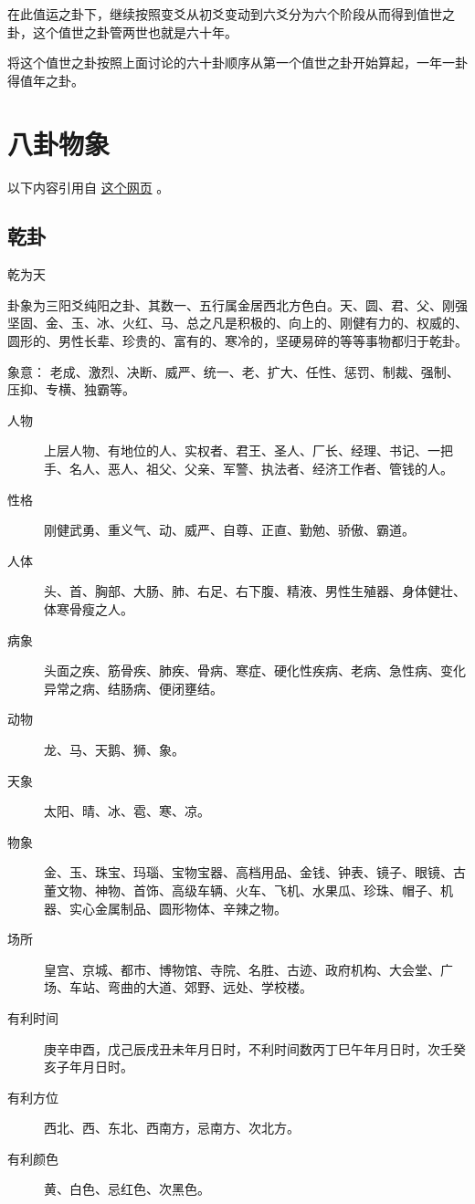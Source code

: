 \documentclass[12pt,oneside]{book}
\begin{document}
在此值运之卦下，继续按照变爻从初爻变动到六爻分为六个阶段从而得到值世之卦，这个值世之卦管两世也就是六十年。

将这个值世之卦按照上面讨论的六十卦顺序从第一个值世之卦开始算起，一年一卦得值年之卦。

\chapter{八卦物象}
以下内容引用自 \href{https://www.douban.com/note/684840565/}{这个网页} 。

\section{乾卦}
乾为天

卦象为三阳爻纯阳之卦、其数一、五行属金居西北方色白。天、圆、君、父、刚强坚固、金、玉、冰、火红、马、总之凡是积极的、向上的、刚健有力的、权威的、圆形的、男性长辈、珍贵的、富有的、寒冷的，坚硬易碎的等等事物都归于乾卦。

象意： 老成、激烈、决断、威严、统一、老、扩大、任性、惩罚、制裁、强制、压抑、专横、独霸等。


\begin{description}
\item[人物] 上层人物、有地位的人、实权者、君王、圣人、厂长、经理、书记、一把手、名人、恶人、祖父、父亲、军警、执法者、经济工作者、管钱的人。
\item[性格] 刚健武勇、重义气、动、威严、自尊、正直、勤勉、骄傲、霸道。
\item[人体] 头、首、胸部、大肠、肺、右足、右下腹、精液、男性生殖器、身体健壮、体寒骨瘦之人。
\item[病象] 头面之疾、筋骨疾、肺疾、骨病、寒症、硬化性疾病、老病、急性病、变化异常之病、结肠病、便闭壅结。
\item[动物] 龙、马、天鹅、狮、象。
\item[天象] 太阳、晴、冰、雹、寒、凉。
\item[物象] 金、玉、珠宝、玛瑙、宝物宝器、高档用品、金钱、钟表、镜子、眼镜、古董文物、神物、首饰、高级车辆、火车、飞机、水果瓜、珍珠、帽子、机器、实心金属制品、圆形物体、辛辣之物。
\item[场所] 皇宫、京城、都市、博物馆、寺院、名胜、古迹、政府机构、大会堂、广场、车站、弯曲的大道、郊野、远处、学校楼。
\item[有利时间] 庚辛申酉，戊己辰戌丑未年月日时，不利时间数丙丁巳午年月日时，次壬癸亥子年月日时。
\item[有利方位] 西北、西、东北、西南方，忌南方、次北方。
\item[有利颜色] 黄、白色、忌红色、次黑色。
\end{description}
\end{document}
